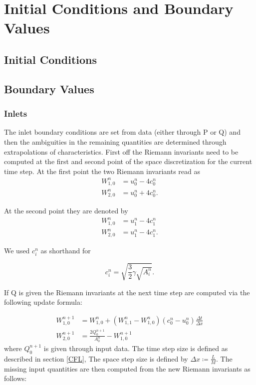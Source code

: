 \documentclass[a4paper, oneside]{discothesis}
\begin{document}
\section{Initial Conditions and Boundary Values}
\subsection{Initial Conditions}
\subsection{Boundary Values}
\subsubsection{Inlets}
The inlet boundary conditions are set from data (either through P or Q) and then the ambiguities in the remaining quantities are determined through extrapolations of characteristics.
First off the Riemann invariants need to be computed at the first and second point of the space discretization for the current time step.
At the first point the two Riemann invariants read as
\begin{align}
	W_{1,0}^n &= u^n_0 - 4c^n_0\\
	W_{2,0}^n &= u^n_0 + 4c^n_0.
\end{align}

At the second point they are denoted by
\begin{align}
	W_{1,0}^n &= u^n_1 - 4c^n_1\\
	W_{2,0}^n &= u^n_1 - 4c^n_1.
\end{align}

We used $c_i^n$ as shorthand for

\begin{equation}
	c^n_i = \sqrt{\frac{3}{2}\gamma\sqrt{A^n_i}}.
\end{equation}

If Q is given the Riemann invariants at the next time step are computed via the following update formula:

\begin{align}
	W_{1,0}^{n+1} &= W^n_{1,0} + (W^n_{1,1} - W^n_{1,0})(c^n_0-u^n_0) \frac{\Delta t}{\Delta x} \label{update1a}\\
	W_{2,0}^{n+1} &= \frac{2Q^{n+1}_0}{A^n_0} - W^{n+1}_{1,0} \label{update2a}
\end{align}
where $Q^{n+1}_0$ is given through input data.
The time step size is defined as described in section \ref{CFL},
The space step size is defined by $\Delta x \coloneqq \frac{L}{M}$.
The missing input quantities are then computed from the new Riemann invariants as follows:
\end{document}
